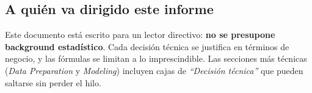 \subsection{A quién va dirigido este informe}

Este documento está escrito para un lector directivo: \textbf{no se presupone background estadístico}. Cada decisión técnica se justifica en términos de negocio, y las fórmulas se limitan a lo imprescindible. Las secciones más técnicas (\textit{Data Preparation} y \textit{Modeling}) incluyen cajas de \textit{``Decisión técnica''} que pueden saltarse sin perder el hilo.
